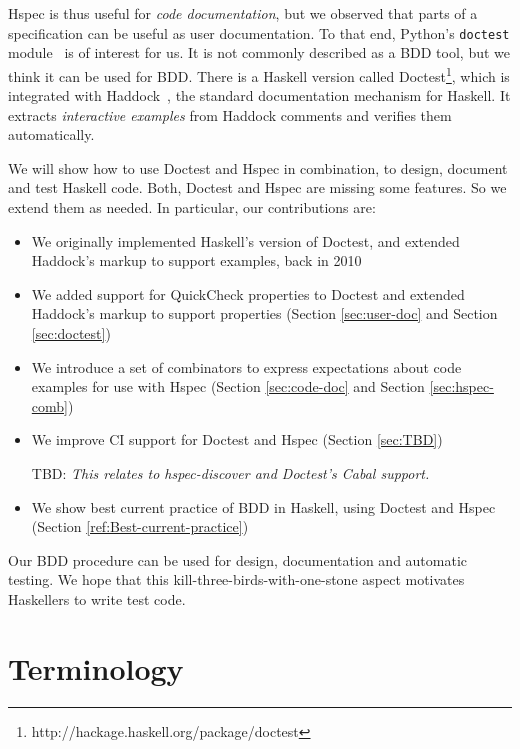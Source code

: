 \documentclass[preprint]{sigplanconf}
\begin{document}
Hspec is thus useful for \emph{code documentation}, but we observed that parts
of a specification can be useful as user documentation. To that end, 
Python's {\tt doctest} module~\cite{doctest} is of interest for us.
It is not commonly described as a BDD tool, but we think it can be
used for BDD.
There is a Haskell version called Doctest\footnote{%
http://hackage.haskell.org/package/doctest}, which is integrated with Haddock~\cite{haddock},
the standard documentation mechanism for Haskell.
It extracts \emph{interactive examples} from Haddock comments and
verifies them automatically.

We will show how to use Doctest and Hspec in combination, to design,
document and test Haskell code.
Both, Doctest and Hspec are missing some features.  So we extend them
as needed.  In particular, our contributions are:

\begin{itemize}
\item
    We originally implemented Haskell's version of Doctest, and
    extended Haddock's markup to support examples, back in 2010
\item
    We added support for QuickCheck properties to Doctest and extended
    Haddock's markup to support properties
    (Section
    \ref{sec:user-doc} and Section \ref{sec:doctest})

\item
    We introduce a set of combinators to express expectations about
    code examples for use with Hspec (Section \ref{sec:code-doc} and
    Section \ref{sec:hspec-comb})

\item
    We improve CI support for Doctest and Hspec (Section
    \ref{sec:TBD})

    TBD:
    \emph{This relates to hspec-discover and Doctest's Cabal support.}

\item
    We show best current practice of BDD in Haskell, using Doctest and
    Hspec (Section \ref{ref:Best-current-practice})

\end{itemize}

\noindent Our BDD procedure
can be used for design, documentation and automatic testing.
We hope that this kill-three-birds-with-one-stone aspect
motivates Haskellers to write test code.

\section{Terminology}
\end{document}
